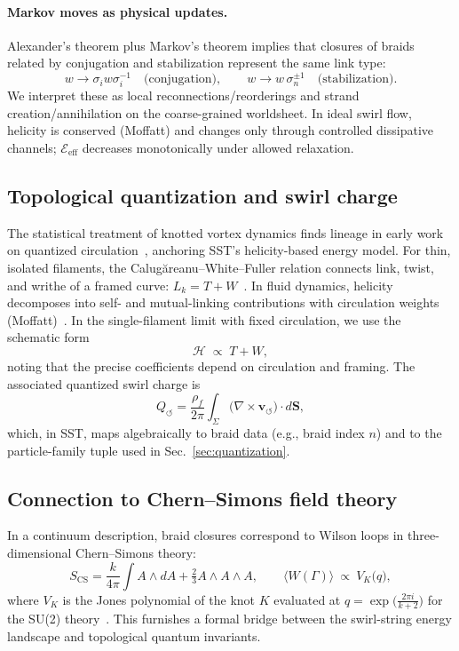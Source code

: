 \documentclass[10pt,reprint,aps,onecolumn,nofootinbib]{revtex4-2}
\begin{document}
    \paragraph*{Markov moves as physical updates.}
        Alexander’s theorem plus Markov’s theorem implies that closures of braids related by conjugation and stabilization represent the same link type:
        \[
            w \to \sigma_i w \sigma_i^{-1}\quad\text{(conjugation)},\qquad
            w \to w\,\sigma_{n}^{\pm 1}\quad\text{(stabilization)}.
        \]
        We interpret these as local reconnections/reorderings and strand creation/annihilation on the coarse-grained worldsheet. In ideal swirl flow, helicity is conserved (Moffatt) and changes only through controlled dissipative channels; \(\mathcal{E}_{\mathrm{eff}}\) decreases monotonically under allowed relaxation.

    \subsection*{Topological quantization and swirl charge}
        The statistical treatment of knotted vortex dynamics finds lineage in early work on quantized circulation~\cite{Onsager1949}, anchoring SST’s helicity-based energy model.
        For thin, isolated filaments, the Calugăreanu–White–Fuller relation connects link, twist, and writhe of a framed curve: \(L_k = T + W\)~\cite{Calugareanu1959,White1969,Fuller1971}. In fluid dynamics, helicity decomposes into self- and mutual-linking contributions with circulation weights (Moffatt)~\cite{Moffatt1969}. In the single-filament limit with fixed circulation, we use the schematic form
        \[
            \mathcal{H} \;\propto\; T + W,
        \]
        noting that the precise coefficients depend on circulation and framing. The associated quantized swirl charge is
        \[
            Q_{\!\circlearrowleft} = \frac{\rho_f}{2\pi}\int_{\Sigma} \big(\nabla\times \mathbf{v}_{\!\boldsymbol{\circlearrowleft}}\big)\cdot d\mathbf{S},
        \]
        which, in SST, maps algebraically to braid data (e.g., braid index \(n\)) and to the particle-family tuple used in Sec.~\ref{sec:quantization}.

    \subsection*{Connection to Chern–Simons field theory}
        In a continuum description, braid closures correspond to Wilson loops in three-dimensional Chern–Simons theory:
        \[
            S_{\mathrm{CS}} = \frac{k}{4\pi}\int A\wedge dA + \tfrac{2}{3}A\wedge A\wedge A,\qquad
            \langle W(\Gamma)\rangle \ \propto\ V_K\!\big(q\big),
        \]
        where \(V_K\) is the Jones polynomial of the knot \(K\) evaluated at \(q=\exp\!\big(\frac{2\pi i}{k+2}\big)\) for the SU(2) theory~\cite{Witten1989}. This furnishes a formal bridge between the swirl-string energy landscape and topological quantum invariants.
\end{document}
